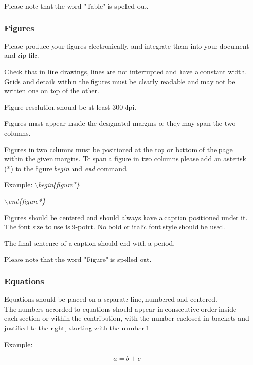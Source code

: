 \documentclass[a4paper,twoside]{article}
\begin{document}
Please note that the word "Table" is spelled out.


\subsubsection{Figures}

Please produce your figures electronically, and integrate them into
your document and zip file.

Check that in line drawings, lines are not interrupted and have a
constant width. Grids and details within the figures must be clearly
readable and may not be written one on top of the other.

Figure resolution should be at least 300 dpi.

Figures must appear inside the designated margins or they may span
the two columns.

Figures in two columns must be positioned at the top or bottom of
the page within the given margins. To span a figure in two columns please add an asterisk (*) to the figure \textit{begin} and \textit{end} command.

Example: \textit{$\backslash$begin\{figure*\}}

\hspace*{1.5cm}\textit{$\backslash$end\{figure*\}}

Figures should be centered and should always have a caption
positioned under it. The font size to use is 9-point. No bold or
italic font style should be used.


The final sentence of a caption should end with a period.



Please note that the word "Figure" is spelled out.

\subsubsection{Equations}

Equations should be placed on a separate line, numbered and
centered.\\The numbers accorded to equations should appear in
consecutive order inside each section or within the contribution,
with the number enclosed in brackets and justified to the right,
starting with the number 1.

Example:

\begin{equation}\label{eq1}
    a=b+c
\end{equation}
\end{document}
